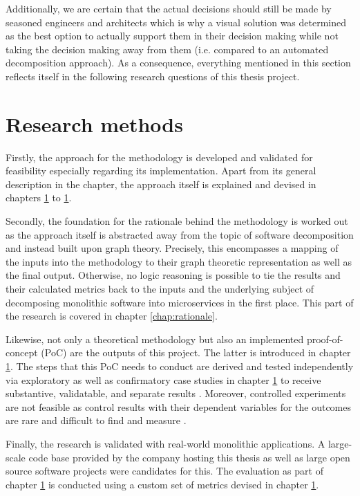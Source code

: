 \documentclass[12pt,a4paper]{report}
\begin{document}
Additionally, we are certain that the actual decisions should still be made
by seasoned engineers and architects which is why a visual solution
was determined as the best option to actually support them in their
decision making while not taking the decision making away from them
(i.e. compared to an automated decomposition approach).
As a consequence, everything mentioned in this section reflects itself in
the following research questions of this thesis project.



\section{Research methods} %

Firstly, the approach for the methodology is developed and validated
for feasibility especially regarding its implementation.
Apart from its general description in the  chapter,
the approach itself is explained and devised in chapters \ref{} to \ref{}.

Secondly, the foundation for the rationale behind the methodology is worked out
as the approach itself is abstracted away from the topic of
software decomposition and instead built upon graph theory.
Precisely, this encompasses a mapping of the inputs into the methodology to
their graph theoretic representation as well as the final output.
Otherwise, no logic reasoning is possible to tie the results and
their calculated metrics back to the inputs and the underlying subject
of decomposing monolithic software into microservices in the first place.
This part of the research is covered in chapter \ref{chap:rationale}.

Likewise, not only a theoretical methodology but also an implemented
proof-of-concept (PoC) are the outputs of this project.
The latter is introduced in chapter \ref{}.
The steps that this PoC needs to conduct are derived and tested
independently via exploratory as well as confirmatory case studies
in chapter \ref{} to receive substantive, validatable,
and separate results \cite{easterbrook2008selecting}.
Moreover, controlled experiments are not feasible as control results
with their dependent variables for the outcomes are rare and difficult
to find and measure \cite{easterbrook2008selecting}.

Finally, the research is validated with real-world monolithic applications.
A large-scale code base provided by the company hosting this thesis as well as
large open source software projects were candidates for this.
The evaluation as part of chapter \ref{} is conducted using
a custom set of metrics devised in chapter \ref{}.
\end{document}
